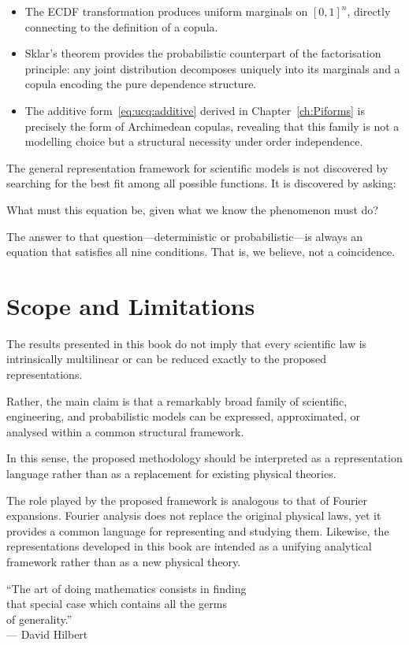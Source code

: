 \begin{itemize}[leftmargin=2.5em]
  \item The ECDF transformation produces uniform marginals on
    $[0,1]^n$, directly connecting to the definition of a copula.
  \item Sklar's theorem provides the probabilistic counterpart of
    the factorisation principle: any joint distribution decomposes
    uniquely into its marginals and a copula encoding the pure
    dependence structure.
  \item The additive form~\eqref{eq:ucq:additive} derived in
    Chapter~\ref{ch:Piforms} is precisely the form of Archimedean
    copulas, revealing that this family is not a modelling choice
    but a structural necessity under order independence.
\end{itemize}

\noindent
The general representation framework for scientific models is not discovered by searching for
the best fit among all possible functions.  It is discovered by
asking:

\begin{center}
What must this equation be, given what we know the phenomenon must
do?
\end{center}

\noindent
The answer to that question---deterministic or probabilistic---is
always an equation that satisfies all nine conditions.  That is,
we believe, not a coincidence.


\section{Scope and Limitations}
The results presented in this book do not imply that every scientific
law is intrinsically multilinear or can be reduced exactly to the
proposed representations.

Rather, the main claim is that a remarkably broad family of scientific,
engineering, and probabilistic models can be expressed, approximated,
or analysed within a common structural framework.

In this sense, the proposed methodology should be interpreted as a
representation language rather than as a replacement for existing
physical theories.

The role played by the proposed framework is analogous to that of
Fourier expansions. Fourier analysis does not replace the original
physical laws, yet it provides a common language for representing and
studying them. Likewise, the representations developed in this book
are intended as a unifying analytical framework rather than as a new
physical theory.

\bigskip

\begin{flushright}
``The art of doing mathematics consists in finding\\
that special case which contains all the germs\\
of generality.''\\\medskip
\upshape --- David Hilbert
\end{flushright}
